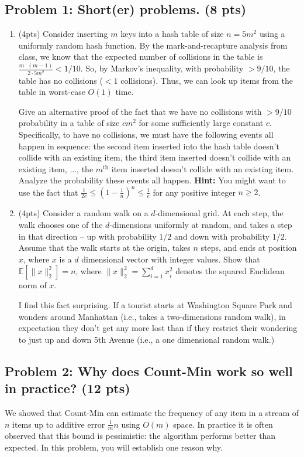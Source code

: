 \documentclass[10pt]{article}
\newcommand{\E}{\mathbb{E}}
\begin{document}
\subsection{Problem 1: Short(er) problems. (8 pts)} 
\begin{enumerate}
	\item (4pts) Consider inserting $m$ keys into a hash table of size  $n = 5 m^2$ using a uniformly random hash function. By the mark-and-recapture analysis from class, we know that the expected number of collisions in the table is $\frac{m\cdot (m-1)}{2\cdot 5 m^2} < 1/10$. So, by Markov's inequality, with probability $> 9/10$, the table has no collisions ($<1$ collisions). Thus, we can look up items from the table in worst-case $O(1)$ time. 
	
	Give an alternative proof of the fact that we have no collisions with $> 9/10$ probability in a table of size $cm^2$ for some sufficiently large constant $c$. Specifically, to have no collisions, we must have the following events all happen in sequence: the second item inserted into the hash table doesn't collide with an existing item, the third item inserted doesn't collide with an existing item, $\ldots$, the $m^\text{th}$ item inserted doesn't collide with an existing item. Analyze the probability these events all happen. \textbf{Hint:} You might want to use the fact that $\frac{1}{2e} \leq (1-\frac{1}{n})^n \leq \frac{1}{e}$ for any positive integer $n \geq 2$. 
	
	\item (4pts) Consider a random walk on a $d$-dimensional grid. At each step, the walk chooses one of the $d$-dimensions uniformly at random, and takes a step in that direction – up with probability $1/2$ and down with probability $1/2$. Assume that the walk starts at the origin, takes $n$ steps, and ends at position $x$, where $x$ is a $d$ dimensional vector with integer values. Show that $\E[\|x\|_2^2] = n$, where $\|x\|_2^2 = \sum_{i=1}^d x_i^2$ denotes the squared Euclidean norm of $x$.  
	
	I find this fact surprising. If a tourist starts at Washington Square Park and wonders around Manhattan (i.e., takes a two-dimensions random walk), in expectation they don't get any more lost than if they restrict their wondering to just up and down 5th Avenue (i.e., a one dimensional random walk.)
\end{enumerate}


\subsection{Problem 2: Why does Count-Min work so well in practice? (12 pts)}
We showed that Count-Min can estimate the frequency of any item in a stream of $n$ items up to additive error $\frac{1}{m} n$ using $O(m)$ space. In practice it is often observed that this bound is pessimistic: the algorithm performs better than expected. In this problem, you will establish one reason why. 
\end{document}

